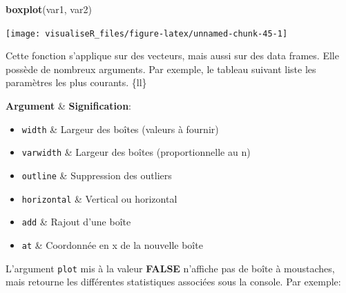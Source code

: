 \documentclass[]{article}
\newenvironment{Shaded}{\begin{snugshade}}{\end{snugshade}}
\newcommand{\CommentTok}[1]{\textcolor[rgb]{0.56,0.35,0.01}{\textit{#1}}}
\newcommand{\DataTypeTok}[1]{\textcolor[rgb]{0.13,0.29,0.53}{#1}}
\newcommand{\KeywordTok}[1]{\textcolor[rgb]{0.13,0.29,0.53}{\textbf{#1}}}
\newcommand{\NormalTok}[1]{#1}
\newcommand{\OtherTok}[1]{\textcolor[rgb]{0.56,0.35,0.01}{#1}}
\providecommand{\tightlist}{%
  \setlength{\itemsep}{0pt}\setlength{\parskip}{0pt}}
\begin{document}
\begin{Shaded}
\begin{Highlighting}[]
\KeywordTok{boxplot}\NormalTok{(var1, var2)}
\end{Highlighting}
\end{Shaded}

\begin{center}\texttt{[image: visualiseR\_files/figure-latex/unnamed-chunk-45-1]} \end{center}

Cette fonction s'applique sur des vecteurs, mais aussi sur des data frames. Elle possède de nombreux arguments. Par exemple, le tableau suivant liste les paramètres les plus courants.
\{ll\}

\textbf{Argument} \& \textbf{Signification}:

\begin{itemize}
\tightlist
\item
  \texttt{width} \& Largeur des boîtes (valeurs à fournir)
\item
  \texttt{varwidth} \& Largeur des boîtes (proportionnelle au n)
\item
  \texttt{outline} \& Suppression des outliers
\item
  \texttt{horizontal} \& Vertical ou horizontal
\item
  \texttt{add} \& Rajout d'une boîte
\item
  \texttt{at} \& Coordonnée en x de la nouvelle boîte
\end{itemize}

L'argument \texttt{plot} mis à la valeur \textbf{FALSE} n'affiche pas de boîte à moustaches, mais retourne les différentes statistiques associées sous la console. Par exemple:

\begin{Shaded}
\end{Shaded}
\end{document}
